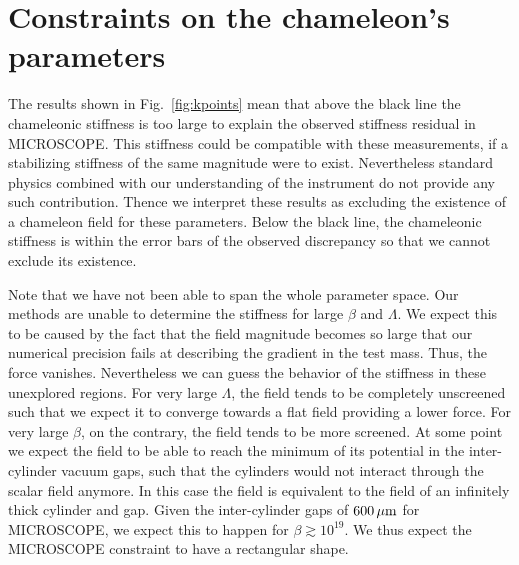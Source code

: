 \documentclass[aps,prd,twocolumn,superscriptaddress,nofootinbib,eqsecnumm,showpacs]{revtex4-1}
\renewcommand\({\left(}
\renewcommand\){\right)}
\renewcommand\[{\left[}
\renewcommand\]{\right]}
\begin{document}
\section{Constraints on the chameleon's parameters}

The results shown in Fig.~\ref{fig:kpoints} mean that above the black line the chameleonic stiffness is too large to explain the observed stiffness residual in MICROSCOPE. This stiffness could be compatible with these measurements, if a stabilizing stiffness of the same magnitude were to exist. Nevertheless standard physics combined with our understanding of the instrument do not provide any such contribution. Thence we interpret these results as excluding the existence of a chameleon field for these parameters. Below the black line, the chameleonic stiffness is within the error bars of the observed discrepancy so that we cannot exclude its existence.

Note that we have not been able to span the whole parameter space. Our methods are unable to determine the stiffness for large $\beta$ and $\Lambda$. We expect this to be caused by the fact that the field magnitude becomes so large that our numerical precision fails at describing the gradient in the test mass. Thus, the force vanishes. Nevertheless we can guess the behavior of the stiffness in these unexplored regions. For very large $\Lambda$, the field tends to be completely unscreened such that we expect it to converge towards a flat field providing a lower force. For very large $\beta$, on the contrary, the field tends to be more screened. At some point we expect the field to be able to reach the minimum of its potential in the inter-cylinder vacuum gaps, such that the cylinders would not interact through the scalar field anymore. In this case the field is equivalent to the field of an infinitely thick cylinder and gap. Given the inter-cylinder gaps of $600\,\mu{\rm m}$ for MICROSCOPE, we expect this to happen for $\beta\gtrsim10^{19}$. We thus expect the MICROSCOPE constraint to have a rectangular shape.
\end{document}

